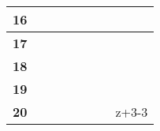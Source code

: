\documentclass[12pt]{article}
\begin{document}
{\begin{tabular}{|
>{}C{0.8cm} |C{2.2cm}|C{2.2cm}|C{2.2cm}|C{2.2cm}|C{2.2cm}|C{2.2cm}|C{2.2cm}|}
\textbf{16} &                                    &                                    &                                    &                                    &                                    &                                    &                                    \\ \hline
\textbf{17} &                                    &                                    &                                    &                                    &                                    &                                    &                                    \\ \hline
\textbf{18} &                                    &                                    &                                    &                                    &                                    &                                    &                                    \\ \hline
\textbf{19} &                                    &                                    &                                    &                                    &                                    &                                    &                                    \\ \hline
\textbf{20} &                                    &                                    &                                    &                                    &                                    &                                    & z+3-3                              \\ \hline
\end{tabular}%
}
\end{document}
